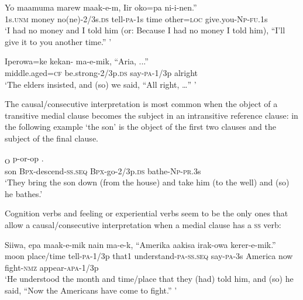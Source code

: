 \ea%
\label{ex:x1434}
\gll Yo  maamuma  marew maak-e-m, {\textquotedbl}Iir  oko=pa  ni-i-nen.''\\
1s.\textsc{unm} money no(ne)-2/3s.\textsc{ds} tell-\textsc{pa}-1s time  other=\textsc{loc} give.you-\textsc{Np}-\textsc{fu}.1s\\
\glt`I had no money and I told him (or: Because I had no money I told him), ``I'll give it to you another time.'' '
\z


\ea%
\label{ex:x1412}
\gll Iperowa=ke  kekan-  ma-e-mik,  ``Aria,  ...'' \\
middle.aged=\textsc{cf} be.strong-2/3p.\textsc{ds} say-\textsc{pa}-1/3p alright\\
\glt`The elders insisted, and (so) we said, ``All right, {\dots}'' '
\z


The causal/consecutive interpretation is most common when the object of a transitive medial clause becomes the subject in an intransitive reference clause: in the following example `the son' is the object of the first two clauses and the subject of the final clause.

\ea%
\label{ex:x1504}
\textsubscript{O}  p-or-op   . \\
son \textsc{Bpx}-descend-\textsc{ss}.\textsc{seq} \textsc{Bpx}-go-2/3p.\textsc{ds} bathe-\textsc{Np}-\textsc{pr}.3s\\
\glt`They bring the son down (from the house) and take him (to the well) and (so) he bathes.'
\z


Cognition verbs and feeling or experiential verbs seem to be the only ones that allow a causal/consecutive interpretation when a medial clause has a \textsc{ss} verb:

\ea%
\label{ex:x1440}
\gll Siiwa,  epa  maak-e-mik  nain    ma-e-k, ``Amerika  aakisa  irak-owa  kerer-e-mik.''\\
moon  place/time  tell-\textsc{pa}-1/3p that1  understand-\textsc{pa}-\textsc{ss}.\textsc{seq} say-\textsc{pa}-3s America now fight-\textsc{nmz} appear-\textsc{apa}-1/3p\\
\glt`He understood the month and time/place that they (had) told him, and (so) he said, ``Now the Americans have come to fight.'' '
\z
{}


